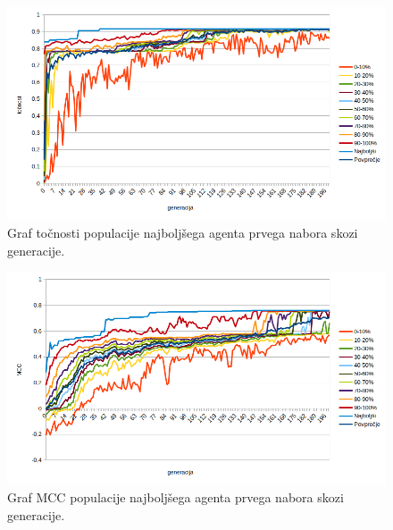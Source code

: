 \begin{figure}[H]
    \begin{center}
        \includegraphics[width=13cm]{shuttle/1/acc}
    \end{center}
    \caption{Graf točnosti populacije najboljšega agenta prvega nabora skozi generacije.}
    \label{fig:statlog_acc_1}
\end{figure}

\begin{figure}[H]
    \begin{center}
        \includegraphics[width=13cm]{shuttle/1/mcc}
    \end{center}
    \caption{Graf MCC populacije najboljšega agenta prvega nabora skozi generacije.}
    \label{fig:statlog_mcc_1}
\end{figure}

